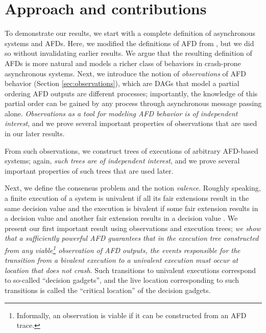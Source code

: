 \documentclass[11pt]{article}
\numberwithin{theorem}{section}
\begin{document}
\section{Approach and contributions}\label{sec:approachAndContributions}
To demonstrate our results, we start with a complete definition of asynchronous systems and AFDs. Here, we modified the definitions of AFD from \cite{cornejoetalAFD,cornejoetalAFD-TR}, but we did so without invalidating earlier results. We argue that the resulting definition of AFDs is more natural and models a richer class of behaviors in crash-prone asynchronous systems. Next, we introduce the notion of \emph{observations} of AFD behavior (Section \ref{sec:observations}), which are DAGs that model a partial ordering AFD outputs are different processes; importantly, the knowledge of this partial order can be gained by any process through asynchronous message passing alone. \emph{Observations as a tool for modeling AFD behavior is of independent interest}, and we prove several important properties of observations that are used in our later results.

From such observations, we construct trees of executions of arbitrary AFD-based systems; again, \emph{such trees are of independent interest}, and we prove several important properties of such trees that are used later.

Next, we define the consensus problem and the notion \emph{valence}. Roughly speaking, a finite execution of a system is univalent if all its fair extensions result in the same decision value and the execution is bivalent if some fair extension results in a decision value  and another fair extension results in a decision value . We present our first important result using observations and execution trees; \emph{we show that a sufficiently powerful AFD guarantees that in the execution tree constructed from any viable\footnote{Informally, an observation is viable if it can be constructed from an AFD trace.} observation of AFD outputs, the events responsible for the transition from a bivalent execution to a univalent execution must occur at location that does not crash}. Such transitions to univalent executions correspond to so-called ``decision gadgets'', and the live location corresponding to such transitions is called the ``critical location'' of the decision gadgets.
\end{document}
